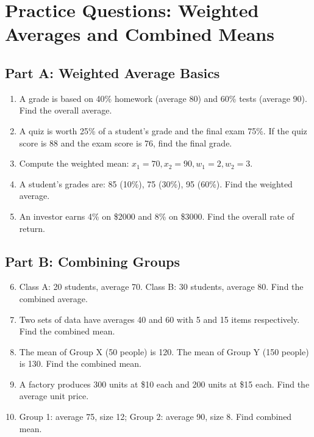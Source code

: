 \documentclass[14pt]{extarticle}
\begin{document}

\section*{Practice Questions: Weighted Averages and Combined Means}

\subsection*{Part A: Weighted Average Basics}
\begin{enumerate}
  \item A grade is based on 40\% homework (average 80) and 60\% tests (average 90). Find the overall average.
  \item A quiz is worth 25\% of a student’s grade and the final exam 75\%. If the quiz score is 88 and the exam score is 76, find the final grade.
  \item Compute the weighted mean: \(x_1=70, x_2=90, w_1=2, w_2=3.\)
  \item A student’s grades are: 85 (10\%), 75 (30\%), 95 (60\%). Find the weighted average.
  \item An investor earns 4\% on \$2000 and 8\% on \$3000. Find the overall rate of return.
\end{enumerate}

\subsection*{Part B: Combining Groups}
\begin{enumerate}
  \setcounter{enumi}{5}
  \item Class A: 20 students, average 70. Class B: 30 students, average 80. Find the combined average.
  \item Two sets of data have averages 40 and 60 with 5 and 15 items respectively. Find the combined mean.
  \item The mean of Group X (50 people) is 120. The mean of Group Y (150 people) is 130. Find the combined mean.
  \item A factory produces 300 units at \$10 each and 200 units at \$15 each. Find the average unit price.
  \item Group 1: average 75, size 12; Group 2: average 90, size 8. Find combined mean.
\end{enumerate}
\end{document}
